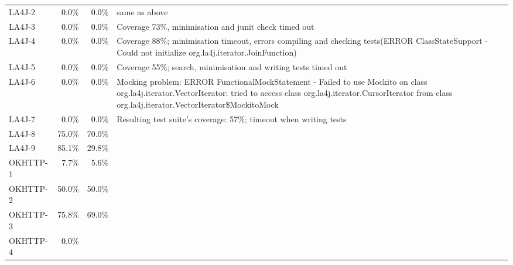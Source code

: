 \begin{tabular}{ l rrrrrrr rrrrrrrr}
LA4J-2 & \cellcolor{light-gray} \textcolor{black}{0.0}\% &
                                                           \cellcolor{light-gray} \textcolor{black}{0.0}\%
 & \multicolumn{13}{l}{same as above}\\ 
LA4J-3 & \cellcolor{light-gray} \textcolor{black}{0.0}\% &
                                                           \cellcolor{light-gray}
                                                           \textcolor{black}{0.0}\%
 & \multicolumn{13}{l}{Coverage 73\%, minimisation and junit check
   timed out}\\ 
LA4J-4 & \cellcolor{light-gray} \textcolor{black}{0.0}\% &
                                                           \cellcolor{light-gray}
                                                           \textcolor{black}{0.0}\%
 & \multicolumn{13}{l}{Coverage 88\%; minimisation timeout, errors compiling and checking tests(ERROR ClassStateSupport - Could not initialize org.la4j.iterator.JoinFunction)}\\ 
LA4J-5 & \cellcolor{light-gray} \textcolor{black}{0.0}\% &
                                                           \cellcolor{light-gray}
                                                           \textcolor{black}{0.0}\%
 & \multicolumn{13}{l}{Coverage 55\%; search, minimisation and writing tests timed out}\\ 
LA4J-6 & \cellcolor{light-gray} \textcolor{black}{0.0}\% &
                                                           \cellcolor{light-gray} \textcolor{black}{0.0}\%
 & \multicolumn{13}{l}{Mocking problem: ERROR FunctionalMockStatement - Failed to use Mockito on class org.la4j.iterator.VectorIterator: tried to access class org.la4j.iterator.CursorIterator from class org.la4j.iterator.VectorIterator\$MockitoMock}\\ 
LA4J-7 & \cellcolor{light-gray} \textcolor{black}{0.0}\% &
                                                           \cellcolor{light-gray}
                                                           \textcolor{black}{0.0}\% 
& \multicolumn{13}{l}{Resulting test suite's coverage: 57\%; timeout when
  writing tests}\\ 
LA4J-8 & 75.0\% & 70.0\%\\ 
LA4J-9 & 85.1\% & 29.8\%\\ 
OKHTTP-1 & 7.7\% & 5.6\%\\ 
OKHTTP-2 & 50.0\% & 50.0\%\\ 
OKHTTP-3 & 75.8\% & 69.0\%\\ 
OKHTTP-4 & \cellcolor{light-gray} \textcolor{black}{0.0}\% &

\end{tabular}
